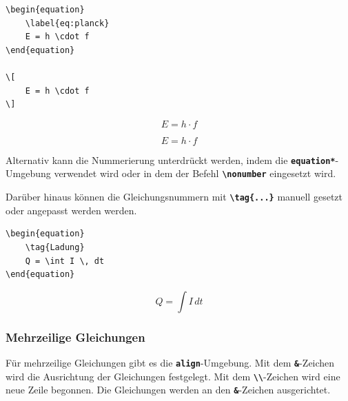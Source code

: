 \begin{minipage}{0.5\textwidth}
    \begin{lstlisting}[language={[LaTeX]TeX}]
\begin{equation}
    \label{eq:planck}
    E = h \cdot f
\end{equation}

\[
    E = h \cdot f
\]

\end{lstlisting}
\end{minipage}
\hfill
\begin{minipage}{0.5\textwidth}
    \begin{equation}
        \label{eq:planck}
        E = h \cdot f
    \end{equation}

    \[
        E = h \cdot f
    \]
\end{minipage}
Alternativ kann die Nummerierung unterdrückt werden, indem die \textbf{\texttt{equation*}}-Umgebung verwendet wird oder in dem der Befehl \textbf{\texttt{\textbackslash nonumber}} eingesetzt wird.

Darüber hinaus können die Gleichungsnummern mit \textbf{\texttt{\textbackslash tag\{...\}}} manuell gesetzt oder angepasst werden werden.

\begin{minipage}{0.5\textwidth}
    \begin{lstlisting}[language={[LaTeX]TeX}]
\begin{equation}
    \tag{Ladung}
    Q = \int I \, dt
\end{equation}
\end{lstlisting}
\end{minipage}
\hfill
\begin{minipage}{0.5\textwidth}
    \begin{equation}
        \tag{Ladung}
        Q = \int I \, dt
    \end{equation}
\end{minipage}

\subsubsection{Mehrzeilige Gleichungen}
Für mehrzeilige Gleichungen gibt es die \textbf{\texttt{align}}-Umgebung. Mit dem \textbf{\texttt{\&}}-Zeichen wird die Ausrichtung der Gleichungen festgelegt. Mit dem \textbf{\texttt{\textbackslash\textbackslash}}-Zeichen wird eine neue Zeile begonnen. Die Gleichungen werden an den \textbf{\texttt{\&}}-Zeichen ausgerichtet.

